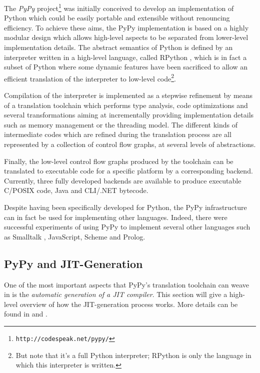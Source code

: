 The \emph{PyPy} project\footnote{\texttt{http://codespeak.net/pypy/}}
\cite{RigoPedroni06} was initially conceived to develop an implementation of Python which
could be easily portable and extensible without renouncing efficiency.
To achieve these aims, the PyPy implementation is based on a highly
modular design which allows high-level aspects
to be separated from lower-level implementation details.
The abstract semantics of Python is defined by an interpreter written
in a high-level language, called RPython \cite{AACM-DLS07}, which is in fact a subset of
Python where some dynamic features have been sacrificed to allow an
efficient translation of the interpreter to low-level code\footnote{But note that it's a full Python interpreter; RPython is only the
language in which this interpreter is written.}.

Compilation of the interpreter is implemented as a stepwise
refinement by means of a translation toolchain which performs type
analysis, code optimizations and several transformations aiming at 
incrementally providing implementation details such as memory management or the threading model.
The different kinds of intermediate codes  which are refined 
during the translation process are all represented by a collection of control flow graphs,
at several levels of abstractions.

Finally, the low-level control flow graphs produced by the toolchain
can be translated to executable code for a specific platform by a
corresponding backend.
Currently, three fully developed backends are available to produce
executable C/POSIX code, Java and CLI/.NET bytecode. 

Despite having been specifically developed for Python, the PyPy infrastructure
can in fact be used for implementing other languages. Indeed, there were
successful experiments of using PyPy to implement several other languages such
as Smalltalk \cite{BolzEtAl08}, JavaScript, Scheme and Prolog.


\subsection{PyPy and JIT-Generation}
\label{sec:jitgen}

One of the most important aspects that PyPy's translation toolchain can weave
in is the \emph{automatic generation of a JIT compiler}.  This section will
give a high-level overview of how the JIT-generation process works. More
details can be found in \cite{PyPyJIT} and \cite{PyPyJIT09}.

